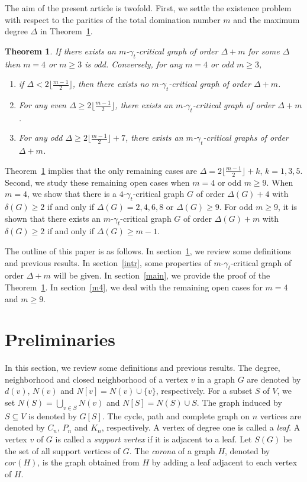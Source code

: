 \documentclass[12pt]{amsart}
\newtheorem{thm}{Theorem}
\begin{document}
The aim of the present article is twofold. First, we settle the
existence problem with respect to the parities of the total
domination number $m$ and the maximum degree $\Delta$ in Theorem~\ref{mainthm0}.

\begin{thm} \label{mainthm0} If there exists an $m$-$\gamma_t$-critical graph of order $\Delta+m$ for some $\Delta$ then $m=4$ or $m \ge 3$ is odd. Conversely, for any $m=4$ or odd $m \ge 3$,
\begin{enumerate}
\item[$(1)$] if  $\Delta < 2\lfloor\frac{m-1}{2}\rfloor$, then there exists no $m$-$\gamma_t$-critical graph of order $\Delta+m$.
\item[$(2)$]
 For any even $\Delta \ge 2\lfloor \frac{m-1}{2}\rfloor$, there exists an $m$-$\gamma_t$-critical graph of order $\Delta+m$.
\item[$(3)$] For any odd $\Delta \ge 2\lfloor \frac{m-1}{2}\rfloor
+7$, there exists an $m$-$\gamma_t$-critical graphs of order
$\Delta+m$.
 \end{enumerate}
\end{thm}

Theorem~\ref{mainthm0} implies that the only remaining cases are
$\Delta = 2\lfloor\frac{m-1}{2}\rfloor +k$, $k=1, 3, 5$. Second,
we study these remaining open cases when $m=4$ or odd $m \ge 9$. When $m=4$, we show that
there is a $4$-$\gamma_{t}$-critical graph $G$ of order $\Delta(G) +4$ with
$\delta(G) \geq 2$ if and only if  $\Delta(G) = 2,4,6,8$   or  $\Delta(G) \ge 9$.
For odd $m \ge 9$, it is shown that there exists an $m$-$\gamma_{t}$-critical graph $G$ of order $\Delta(G) +m$ with $\delta(G) \ge 2$ if and only if   $\Delta(G) \ge
m-1$.

The outline of this paper is as follows. In
section~\ref{preliminaries}, we review some definitions and
previous results. In section~\ref{intr}, some properties of
$m$-$\gamma_{t}$-critical graph of order $\Delta+m$ will be
given. In section~\ref{main}, we provide the proof of the
Theorem~\ref{mainthm0}. In section~\ref{m4}, we deal with the
remaining open cases for $m=4$ and $m \ge 9$.

 \section{Preliminaries} \label{preliminaries}

In this section, we review some definitions and previous results.
The degree, neighborhood and closed neighborhood of a vertex $v$ in a
graph $G$ are denoted by $d(v)$, $N(v)$ and $N[v]=N(v)\cup\{v\}$,
respectively. For a subset $S$ of $V$, we set $N(S)=\bigcup_{v\in S}N(v)$
and $N[S]=N(S)\cup S$. The graph induced by $S\subseteq V$ is denoted by $G[S]$.
The cycle, path and complete graph on $n$ vertices are
denoted by $C_{n}$,  $P_{n}$ and $K_{n}$, respectively. A vertex of degree one is called a \emph{leaf}.
A vertex $v$ of $G$ is called a \emph{support vertex} if it is adjacent to a
leaf. Let $S(G)$ be the set of all support vertices of $G$. The \emph{corona} of
a graph $H$, denoted by $cor(H)$, is the graph obtained from $H$ by adding a leaf adjacent
to each vertex of $H$.
\end{document}
